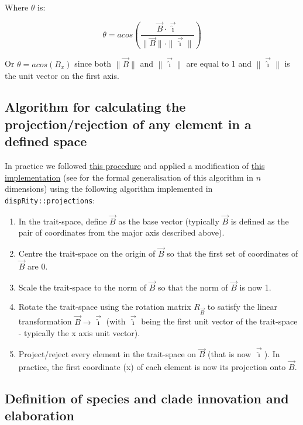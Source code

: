 \documentclass[12pt,a4paper]{article}
\begin{document}
Where $\theta$ is:

\begin{equation}
    \theta = acos \left(\frac{\vec{B} \cdot \vec{\hat{\imath}}}{\|\vec{B}\| \cdot \|\vec{\hat{\imath}}\|} \right)
\end{equation}

Or $\theta = acos (B_x)$ since both $\|\vec{B}\|$ and $\|\vec{\hat{\imath}}\|$ are equal to 1 and $\|\vec{\hat{\imath}}\|$ is the unit vector on the first axis.

\subsection{Algorithm for calculating the projection/rejection of any element in a defined space}

In practice we followed \href{https://math.stackexchange.com/questions/598750/finding-the-rotation-matrix-in-n-dimensions}{this procedure} and applied a modification of \href{https://stackoverflow.com/questions/42520301/find-rotation-matrix-of-one-vector-to-another-using-r/42542385#42542385}{this implementation} (see \cite{aguilera2004} for the formal generalisation of this algorithm in $n$ dimensions) using the following algorithm implemented in \texttt{dispRity::projections}:

\begin{enumerate}
 \item In the trait-space, define $\vec{B}$ as the base vector (typically $\vec{B}$ is defined as the pair of coordinates from the major axis described above).
 \item Centre the trait-space on the origin of $\vec{B}$ so that the first set of coordinates of $\vec{B}$ are 0.
 \item Scale the trait-space to the norm of $\vec{B}$ so that the norm of $\vec{B}$ is now 1.
 \item Rotate the trait-space using the rotation matrix $R_{\vec{B}}$ to satisfy the linear transformation $\vec{B} \rightarrow \vec{\hat{\imath}}$ (with $\vec{\hat{\imath}}$ being the first unit vector of the trait-space - typically the x axis unit vector). 
 \item Project/reject every element in the trait-space on $\vec{B}$ (that is now $\vec{\hat{\imath}}$). In practice, the first coordinate (x) of each element is now its projection onto $\vec{B}$.
\end{enumerate}


\subsection{Definition of species and clade innovation and elaboration}
\end{document}
